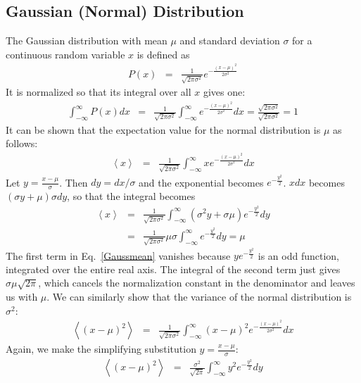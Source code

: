\documentclass{revtex4}
\begin{document}
\subsection{Gaussian (Normal) Distribution}
The Gaussian distribution with mean $\mu$ and standard deviation
$\sigma$ for a continuous random variable $x$ is defined as
\begin{eqnarray}
  P(x) &=& \frac{1}{\sqrt{2\pi \sigma^2}}e^{-\frac{(x-\mu)^2}{2\sigma^2}}
\end{eqnarray}
It is normalized so that its integral over all $x$ gives one:
\begin{eqnarray}
  \int_{-\infty}^\infty P(x) dx &=& \frac{1}{\sqrt{2\pi \sigma^2}}
  \int_{-\infty}^\infty e^{-\frac{(x-\mu)^2}{2\sigma^2}} dx =
  \frac{\sqrt{2\pi \sigma^2}}{\sqrt{2\pi\sigma^2}} = 1
\end{eqnarray}
It can be shown that the expectation value for the normal distribution
is $\mu$ as follows:
\begin{eqnarray}
  \left<x\right> &=& \frac{1}{\sqrt{2\pi\sigma^2}}
  \int_{-\infty}^{\infty} x e^{-\frac{(x-\mu)^2}{2\sigma^2}} dx
\end{eqnarray}
Let $y = \frac{x-\mu}{\sigma}$. Then $dy = dx/\sigma$ and the
exponential becomes $e^{-\frac{y^2}{2}}$. $x dx$ becomes $(\sigma y +
\mu) \sigma dy$, so that the integral becomes
\begin{eqnarray}
  \left<x\right> &=& \frac{1}{\sqrt{2\pi \sigma^2}}
  \int_{-\infty}^\infty \left(\sigma^2 y + \sigma \mu\right)
    e^{-\frac{y^2}{2}} dy \label{Gaussmean} \\
    &=& \frac{1}{\sqrt{2\pi \sigma^2}} \mu \sigma
    \int_{-\infty}^\infty e^{-\frac{y^2}{2}} dy = \mu
\end{eqnarray}
The first term in Eq.~\eqref{Gaussmean} vanishes because
$ye^{-\frac{y^2}{2}}$ is an odd function, integrated over the entire
real axis. The integral of the second term just gives $\sigma \mu
\sqrt{2\pi}$, which cancels the normalization constant in the
denominator and leaves us with $\mu$. We can similarly show that the
variance of the normal distribution is $\sigma^2$:
\begin{eqnarray}
  \left<(x-\mu)^2\right> &=& \frac{1}{\sqrt{2\pi \sigma^2}}
  \int_{-\infty}^\infty (x-\mu)^2 e^{-\frac{(x-\mu)^2}{2\sigma^2}} dx
\end{eqnarray}
Again, we make the simplifying substitution $y = \frac{x-\mu}{\sigma}$:
\begin{eqnarray}
  \left<(x-\mu)^2\right> &=& \frac{\sigma^2}{\sqrt{2\pi}}
  \int_{-\infty}^\infty y^2 e^{-\frac{y^2}{2}} dy
\end{eqnarray}
\end{document}
